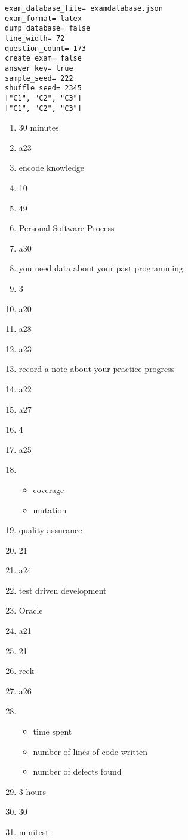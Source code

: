 \documentclass{exam}
\begin{document}
\newpage
\begin{verbatim}
exam_database_file= examdatabase.json
exam_format= latex
dump_database= false
line_width= 72
question_count= 173
create_exam= false
answer_key= true
sample_seed= 222
shuffle_seed= 2345
["C1", "C2", "C3"]
["C1", "C2", "C3"]
\end{verbatim}
\begin{enumerate}
\item 30 minutes
\item a23
\item encode knowledge
\item 10
\item 49
\item Personal Software Process
\item a30
\item you need data about your past programming
\item 3
\item a20
\item a28
\item a23
\item record a note about your practice progress
\item a22
\item a27
\item 4
\item a25
\item \begin{itemize}
\item coverage
\item mutation
\end{itemize}
\item quality assurance
\item 21
\item a24
\item test driven development
\item Oracle
\item a21
\item 21
\item reek
\item a26
\item \begin{itemize}
\item time spent
\item number of lines of code written
\item number of defects found
\end{itemize}
\item 3 hours
\item 30
\item minitest
\end{enumerate}
\end{document}
